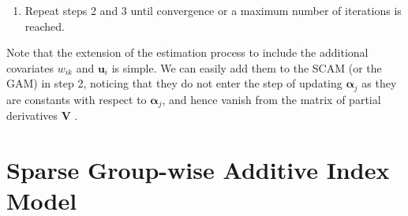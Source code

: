 \documentclass[11pt,a4paper,]{article}
\begin{document}
\begin{enumerate}
  \begin{enumerate}
  \def\labelenumii{\alph{enumii}.}
  \item
    Obtain the update
    \(\bm{\delta} = \left ( \bm{\delta}_{1}, \dots, \bm{\delta}_{p}\right )^{T}, \bm{\delta} = \bm{\alpha}_{old} - \bm{\alpha}_{new}\),
    where \(\bm{\alpha}_{old}\) is the current value of \(\bm{\alpha}\),
    and \(\bm{\alpha}_{new}\) is the new value of \(\bm{\alpha}\) to be
    computed, using the QP given below in Equation~\ref{eq-5}.
    \begin{equation}\protect\hypertarget{eq-5}{}{
      \begin{aligned}
       \min_{\bm{\delta}} \quad & \bm{\delta}^{T}\bm{V}^{T}\bm{V}\bm{\delta} - 2\bm{\delta}^{T}\bm{V}^{T}\bm{r} \\
       \text{s.t.} \quad & \bm{C}\bm{\delta} + \bm{C}\bm{\alpha}_{old} \ge 0,
      \end{aligned}
      }\label{eq-5}\end{equation} where \(\bm{V}\) is the matrix of
    partial derivatives of the right hand side of Equation~\ref{eq-2},
    with respect to \(\bm{\alpha}_{j}\). The \(i^{th}\) line of
    \(\bm{V}\) contains
    \(\left [ \bm{v}_{i1}, \dots, \bm{v}_{ip} \right ]\), where
    \(\bm{v}_{ij} = \bm{x}_{ij}g_{j}^{'}(h_{ij})\). The current residual
    vector, which contains
    \(r_{i} = y_{i} - \beta_{0} - \sum_{j = 1}^{p}g_{j}(\bm{\alpha}_{j(old)}^{T}\bm{x}_{ij})\),
    is denoted by \(\bm{r}\).
  \item
    Set updated index coefficients
    \(\bm{\alpha}_{new} = \bm{\alpha}_{old} + \bm{\delta}\).
  \item
    Scale each estimated index coefficients
    \(\hat{\bm{\alpha}}_{j} = \bm{\alpha}_{j(new)}\) to have unit norm.
  \end{enumerate}
\item
  Repeat steps 2 and 3 until convergence or a maximum number of
  iterations is reached.
\end{enumerate}

Note that the extension of the estimation process to include the
additional covariates \(w_{ik}\) and \(\bm{u}_{i}\) is simple. We can
easily add them to the SCAM (or the GAM) in step 2, noticing that they
do not enter the step of updating \(\bm{\alpha}_{j}\) as they are
constants with respect to \(\bm{\alpha}_{j}\), and hence vanish from the
matrix of partial derivatives \(\bm{V}\) \autocite{Masselot2022}.

\hypertarget{sec-SGAIM}{%
\section{Sparse Group-wise Additive Index Model}\label{sec-SGAIM}}
\end{document}
